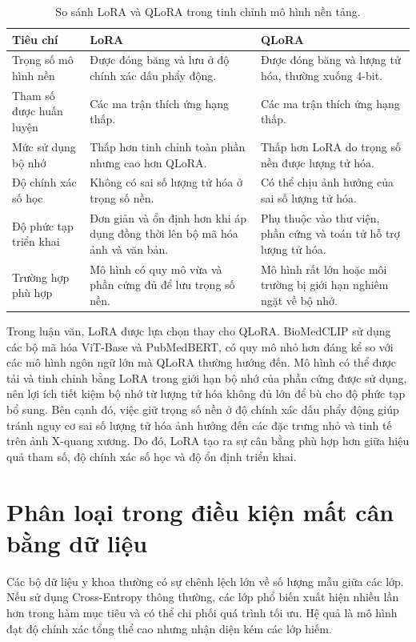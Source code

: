 \begin{table}[H]
\centering
\begin{tabular}{|p{3.3cm}|p{5.0cm}|p{5.0cm}|}
\hline
\textbf{Tiêu chí} & \textbf{LoRA} & \textbf{QLoRA} \\ \hline
Trọng số mô hình nền &
Được đóng băng và lưu ở độ chính xác dấu phẩy động. &
Được đóng băng và lượng tử hóa, thường xuống 4-bit. \\ \hline
Tham số được huấn luyện &
Các ma trận thích ứng hạng thấp. &
Các ma trận thích ứng hạng thấp. \\ \hline
Mức sử dụng bộ nhớ &
Thấp hơn tinh chỉnh toàn phần nhưng cao hơn QLoRA. &
Thấp hơn LoRA do trọng số nền được lượng tử hóa. \\ \hline
Độ chính xác số học &
Không có sai số lượng tử hóa ở trọng số nền. &
Có thể chịu ảnh hưởng của sai số lượng tử hóa. \\ \hline
Độ phức tạp triển khai &
Đơn giản và ổn định hơn khi áp dụng đồng thời lên bộ mã hóa ảnh và văn bản. &
Phụ thuộc vào thư viện, phần cứng và toán tử hỗ trợ lượng tử hóa. \\ \hline
Trường hợp phù hợp &
Mô hình có quy mô vừa và phần cứng đủ để lưu trọng số nền. &
Mô hình rất lớn hoặc môi trường bị giới hạn nghiêm ngặt về bộ nhớ. \\ \hline
\end{tabular}
\caption{So sánh LoRA và QLoRA trong tinh chỉnh mô hình nền tảng.}
\label{tab:lora_qlora}
\end{table}

Trong luận văn, LoRA được lựa chọn thay cho QLoRA. BioMedCLIP sử dụng các bộ mã hóa ViT-Base và PubMedBERT, có quy mô nhỏ hơn đáng kể so với các mô hình ngôn ngữ lớn mà QLoRA thường hướng đến. Mô hình có thể được tải và tinh chỉnh bằng LoRA trong giới hạn bộ nhớ của phần cứng được sử dụng, nên lợi ích tiết kiệm bộ nhớ từ lượng tử hóa không đủ lớn để bù cho độ phức tạp bổ sung. Bên cạnh đó, việc giữ trọng số nền ở độ chính xác dấu phẩy động giúp tránh nguy cơ sai số lượng tử hóa ảnh hưởng đến các đặc trưng nhỏ và tinh tế trên ảnh X-quang xương. Do đó, LoRA tạo ra sự cân bằng phù hợp hơn giữa hiệu quả tham số, độ chính xác số học và độ ổn định triển khai.

\section{Phân loại trong điều kiện mất cân bằng dữ liệu}
\label{sec:wce_related}

Các bộ dữ liệu y khoa thường có sự chênh lệch lớn về số lượng mẫu giữa các lớp. Nếu sử dụng Cross-Entropy thông thường, các lớp phổ biến xuất hiện nhiều lần hơn trong hàm mục tiêu và có thể chi phối quá trình tối ưu. Hệ quả là mô hình đạt độ chính xác tổng thể cao nhưng nhận diện kém các lớp hiếm.


